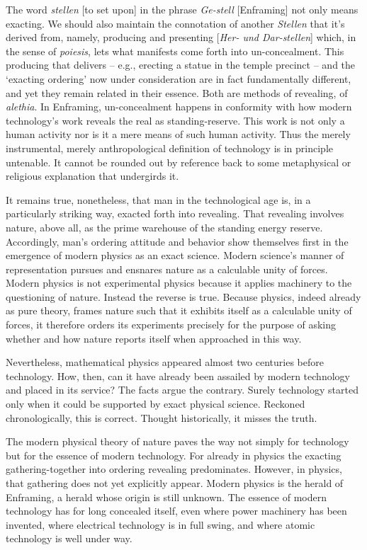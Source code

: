 \documentclass[12pt]{article}
\begin{document}
The word \textit{stellen} [to set upon] in the phrase \textit{Ge-stell} [Enframing] not only means exacting. We should also maintain the connotation of another \textit{Stellen} that it's derived from, namely, producing and presenting [\textit{Her- und Dar-stellen}] which, in the sense of \textit{poi{\-e}sis}, lets what manifests come forth into un-concealment. This producing that delivers -- e.g., erecting a statue in the temple precinct -- and the `exacting ordering' now under consideration are in fact fundamentally different, and yet they remain related in their essence. Both are methods of revealing, of \textit{al{\-e}thia}. In Enframing, un-concealment happens in conformity with how modern technology's work reveals the real as standing-reserve. This work is not only a human activity nor is it a mere means of such human activity. Thus the merely instrumental, merely anthropological definition of technology is in principle untenable. It cannot be rounded out by reference back to some metaphysical or religious explanation that undergirds it.

It remains true, nonetheless, that man in the technological age is, in a particularly striking way, exacted forth into revealing. That revealing involves nature, above all, as the prime warehouse of the standing energy reserve. Accordingly, man's ordering attitude and behavior show themselves first in the emergence of modern physics as an exact science. Modern science's manner of representation pursues and ensnares nature as a calculable unity of forces. Modern physics is not experimental physics because it applies machinery to the questioning of nature. Instead the reverse is true. Because physics, indeed already as pure theory, frames nature such that it exhibits itself as a calculable unity of forces, it therefore orders its experiments precisely for the purpose of asking whether and how nature reports itself when approached in this way.

Nevertheless, mathematical physics appeared almost two centuries before technology. How, then, can it have already been assailed by modern technology and placed in its service? The facts argue the contrary. Surely technology started only when it could be supported by exact physical science. Reckoned chronologically, this is correct. Thought historically, it misses the truth.

The modern physical theory of nature paves the way not simply for technology but for the essence of modern technology. For already in physics the exacting gathering-together into ordering revealing predominates. However, in physics, that gathering does not yet explicitly appear. Modern physics is the herald of Enframing, a herald whose origin is still unknown. The essence of modern technology has for long concealed itself, even where power machinery has been invented, where electrical technology is in full swing, and where atomic technology is well under way.
\end{document}
